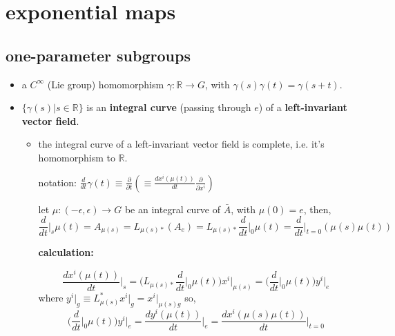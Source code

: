 \chapter{exponential maps}
\section{one-parameter subgroups}
\begin{itemize}
	\item a $C^\infty$ (Lie group) homomorphism $\gamma: \mathbb{R} \rightarrow G$, with $\gamma(s) \gamma(t) = \gamma(s + t)$.
	
	\item $\{\gamma(s) | s \in \mathbb{R}\}$ is an \textbf{integral curve} (passing through $e$) of a \textbf{left-invariant vector field}.
	
	\begin{itemize}
		\item the integral curve of a left-invariant vector field is complete, i.e. it’s homomorphism to $\mathbb{R}$.
		
		\begin{tcolorbox}[title=proof:]
			notation: $\frac{d}{dt} \gamma(t) \equiv \frac{\partial}{\partial t} (\equiv \frac{d x^i(\mu(t))}{dt} \frac{\partial}{\partial x^i})$
			
			let $\mu : (- \epsilon, \epsilon) \rightarrow G$ be an integral curve of $\bar{A}$, with $\mu(0) = e$, then,
			\begin{equation}
				\frac{d}{dt} \Big|_s \mu(t) = A_{\mu(s)} = L_{\mu(s) *} (A_e) = L_{\mu(s) *} \frac{d}{dt} \Big|_0 \mu(t) = \frac{d}{dt} \Big|_{t = 0} (\mu(s) \mu(t))
			\end{equation}
			
			\noindent\hdashrule[0.5ex]{\linewidth}{0.5pt}{1mm} %
			
			\textbf{calculation:}
			
			\begin{equation}
				\frac{d x^i(\mu(t))}{dt} \Big|_s = \Big( L_{\mu(s) *} \frac{d}{dt} \Big|_0 \mu(t) \Big) x^i \Big|_{\mu(s)} = \Big( \frac{d}{dt} \Big|_0 \mu(t) \Big) y^i \Big|_e
			\end{equation}
			where $y^i \big|_g \equiv L_{\mu(s)}^* x^i \big|_g = x^i \big|_{\mu(s) g}$
			so,
			\begin{equation}
				\Big( \frac{d}{dt} \Big|_0 \mu(t) \Big) y^i \Big|_e = \frac{d y^i(\mu(t))}{dt} \Big|_e = \frac{d x^i(\mu(s) \mu(t))}{dt} \Big|_{t = 0}
			\end{equation}
			

\end{tcolorbox}
\end{itemize}
\end{itemize}
